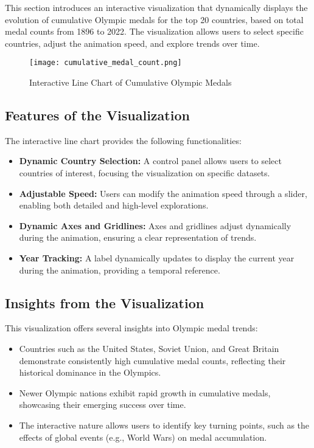 This section introduces an interactive visualization that dynamically displays the evolution of cumulative Olympic medals for the top 20 countries, based on total medal counts from 1896 to 2022. The visualization allows users to select specific countries, adjust the animation speed, and explore trends over time.

\begin{figure}[ht]
    \centering
    \texttt{[image: cumulative\_medal\_count.png]}
    \caption{Interactive Line Chart of Cumulative Olympic Medals}
    \label{fig:line_chart_cumulative_medals}
\end{figure}

\subsection{Features of the Visualization}

The interactive line chart provides the following functionalities:
\begin{itemize}
    \item \textbf{Dynamic Country Selection:} A control panel allows users to select countries of interest, focusing the visualization on specific datasets.
    \item \textbf{Adjustable Speed:} Users can modify the animation speed through a slider, enabling both detailed and high-level explorations.
    \item \textbf{Dynamic Axes and Gridlines:} Axes and gridlines adjust dynamically during the animation, ensuring a clear representation of trends.
    \item \textbf{Year Tracking:} A label dynamically updates to display the current year during the animation, providing a temporal reference.
\end{itemize}

\subsection{Insights from the Visualization}

This visualization offers several insights into Olympic medal trends:
\begin{itemize}
    \item Countries such as the United States, Soviet Union, and Great Britain demonstrate consistently high cumulative medal counts, reflecting their historical dominance in the Olympics.
    \item Newer Olympic nations exhibit rapid growth in cumulative medals, showcasing their emerging success over time.
    \item The interactive nature allows users to identify key turning points, such as the effects of global events (e.g., World Wars) on medal accumulation.
\end{itemize}

